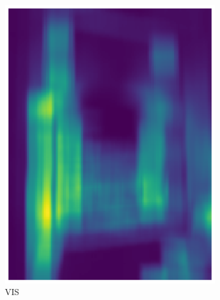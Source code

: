 \documentclass{l4proj}
\begin{document}
\begin{figure}[ht]
  \centering
  \begin{subfigure}[h!]{0.3\textwidth}
    \includegraphics[width=\textwidth]{images/registration/filtered_le_rgb.png}
    \caption{VIS}
  \end{subfigure}
  \begin{subfigure}[h!]{0.3\textwidth}

\end{subfigure}
\end{figure}
\end{document}
